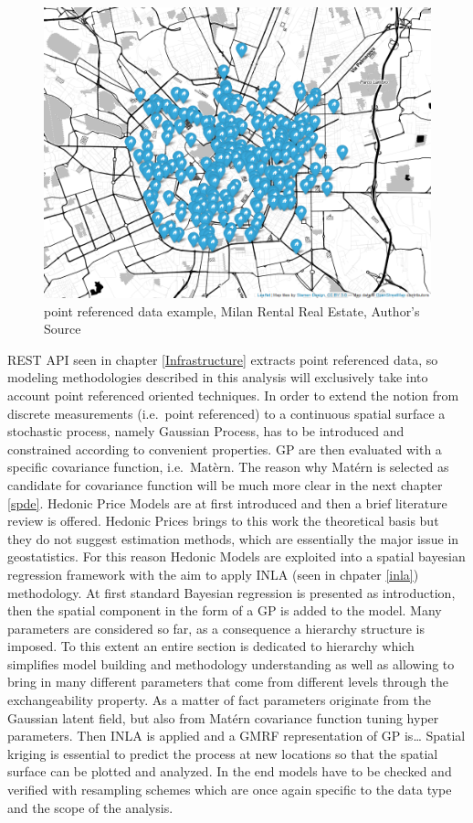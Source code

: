 \documentclass[
  12pt,
  a4paper,
  oneside]{book}
\begin{document}
\begin{figure}
\centering
\includegraphics{images/map.png}
\caption{point referenced data example, Milan Rental Real Estate, Author's Source}
\end{figure}

REST API seen in chapter \ref{Infrastructure} extracts point referenced data, so modeling methodologies described in this analysis will exclusively take into account point referenced oriented techniques.
In order to extend the notion from discrete measurements (i.e.~point referenced) to a continuous spatial surface a stochastic process, namely Gaussian Process, has to be introduced and constrained according to convenient properties. GP are then evaluated with a specific covariance function, i.e.~Matèrn. The reason why Matérn is selected as candidate for covariance function will be much more clear in the next chapter \ref{spde}.
Hedonic Price Models are at first introduced and then a brief literature review is offered. Hedonic Prices brings to this work the theoretical basis but they do not suggest estimation methods, which are essentially the major issue in geostatistics. For this reason Hedonic Models are exploited into a spatial bayesian regression framework with the aim to apply INLA (seen in chpater \ref{inla}) methodology.
At first standard Bayesian regression is presented as introduction, then the spatial component in the form of a GP is added to the model. Many parameters are considered so far, as a consequence a hierarchy structure is imposed. To this extent an entire section is dedicated to hierarchy which simplifies model building and methodology understanding as well as allowing to bring in many different parameters that come from different levels through the exchangeability property.
As a matter of fact parameters originate from the Gaussian latent field, but also from Matérn covariance function tuning hyper parameters.
Then INLA is applied and a GMRF representation of GP is\ldots{}
Spatial kriging is essential to predict the process at new locations so that the spatial surface can be plotted and analyzed.
In the end models have to be checked and verified with resampling schemes which are once again specific to the data type and the scope of the analysis.
\end{document}

